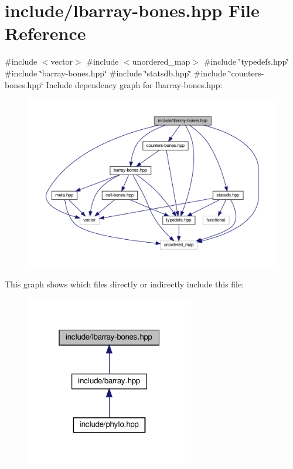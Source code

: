 \hypertarget{lbarray-bones_8hpp}{}\section{include/lbarray-\/bones.hpp File Reference}
\label{lbarray-bones_8hpp}
{\ttfamily \#include $<$vector$>$}\newline
{\ttfamily \#include $<$unordered\+\_\+map$>$}\newline
{\ttfamily \#include \char`\"{}typedefs.\+hpp\char`\"{}}\newline
{\ttfamily \#include \char`\"{}barray-\/bones.\+hpp\char`\"{}}\newline
{\ttfamily \#include \char`\"{}statsdb.\+hpp\char`\"{}}\newline
{\ttfamily \#include \char`\"{}counters-\/bones.\+hpp\char`\"{}}\newline
Include dependency graph for lbarray-\/bones.hpp\+:\nopagebreak
\begin{figure}[H]
\begin{center}
\leavevmode
\includegraphics[width=350pt]{lbarray-bones_8hpp__incl}
\end{center}
\end{figure}
This graph shows which files directly or indirectly include this file\+:
\nopagebreak
\begin{figure}[H]
\begin{center}
\leavevmode
\includegraphics[width=208pt]{lbarray-bones_8hpp__dep__incl}
\end{center}
\end{figure}
